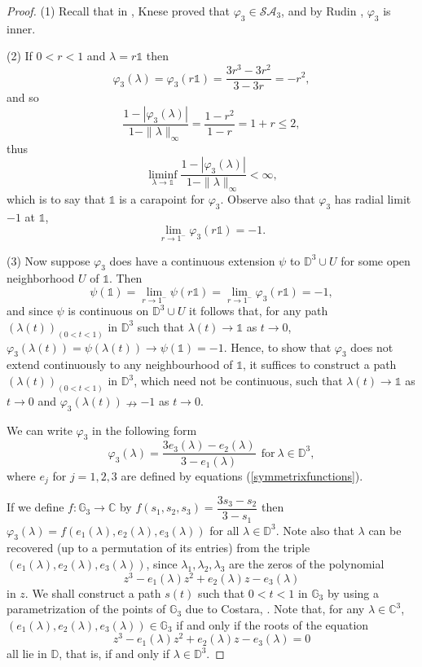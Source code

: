 \documentclass[11pt, reqno]{amsart}
\newcommand\1{\boldsymbol {1}}
\newcommand\lam{\lambda}
\newcommand{\ph}{\varphi}
\numberwithin{equation}{section}
\begin{document}
\begin{proof} (1)
Recall that in \cite{Knese}, Knese proved that $\varphi_3\in\mathcal{SA}_{3}$, and by Rudin \cite[Theorem 5.2.5]{rudinpoly}, $\varphi_3$ is inner. 

(2) If $0 < r < 1$ and $\lam= r\mathds{1}$ then
$$\ph_3(\lam) =\varphi_3(r\mathds{1}) = \dfrac{3r^{3}-3r^{2}}{3-3r} = -r^{2},
$$
and so
\[
\frac{1-|\ph_3(\lam)|}{1-\|\lam\|_\infty} = \frac{1-r^2}{1-r} = 1+r \leq 2,
\]
thus
\[
\liminf_{\lam \to \mathds{1}} \frac{1-|\ph_3(\lam)|}{1-\|\lam\|_\infty}  < \infty,
\]
which is to say that $\mathds{1}$ is a carapoint for $\ph_3$. 
Observe also that $\varphi_3$ has radial limit $-1$ at $\mathds{1}$,
\begin{equation}\label{radiallimitddimenional}
    \lim_{r\rightarrow 1^{-}}\varphi_3(r\mathds{1})=-1.
\end{equation}

(3) Now suppose $\varphi_3$ does have a continuous extension $\psi$ to $\mathbb{D}^{3}\cup U$ for some open neighborhood $U$ of $\mathds{1}$. Then 
$$
\psi(\mathds{1}) = \lim_{r\rightarrow 1^{-}} \psi(r\mathds{1}) = \lim_{r\rightarrow 1^{-}}\varphi_3(r\mathds{1}) = -1,
$$
and since $\psi$ is continuous on $\mathbb{D}^{3}\cup U$ it follows that, for any path $(\lambda(t))_{(0<t<1)}$ in $\mathbb{D}^{3}$ such that $\lambda(t)\rightarrow \mathds{1}$ as $t\rightarrow 0$, $\varphi_3(\lambda(t)) = \psi(\lambda(t))\rightarrow \psi(\mathds{1}) = -1$. Hence, to show that $\varphi_3$ does not extend continuously to any neighbourhood of $\mathds{1}$, it suffices to construct a path $(\lambda(t))_{(0<t<1)}$ in $\mathbb{D}^{3}$, which need not be continuous, such that $\lambda(t)\rightarrow \mathds{1}$ as $t\rightarrow 0$ and $\varphi_3(\lambda(t))\nrightarrow -1$ as $t\rightarrow 0$.

We can write $\varphi_3$ in the following form
$$\varphi_3(\lambda) = \dfrac{3e_{3}(\lambda)-e_{2}(\lambda)}{3-e_{1}(\lambda)}~~\text{for}~\lambda\in\mathbb{D}^{3},$$
where $e_{j}$ for $j=1,2,3$ are defined by equations (\ref{symmetrixfunctions}).

If we define $f:\mathbb{G}_{3}\rightarrow \mathbb{C}$ by $f(s_{1},s_{2},s_{3}) = \dfrac{3s_{3}-s_{2}}{3-s_{1}}$ then $\varphi_3(\lambda) = f(e_{1}(\lambda),e_{2}(\lambda),e_{3}(\lambda))$ for all $\lambda\in\mathbb{D}^{3}$. Note also that $\lambda$ can be recovered (up to a permutation of its entries) from the triple $(e_{1}(\lambda),e_{2}(\lambda),e_{3}(\lambda))$, since $\lambda_{1},\lambda_{2},\lambda_{3}$ are the zeros of the polynomial
$$z^{3}-e_{1}(\lambda)z^{2}+e_{2}(\lambda)z-e_{3}(\lambda)$$
in $z$. We shall construct a path $s(t)$ such that $0<t<1$ in $\mathbb{G}_{3}$ by using a parametrization of the points of $\mathbb{G}_{3}$ due to Costara, \cite[Section 2.5]{Costara}. Note that, for any $\lambda\in\mathbb{C}^{3}$, $(e_{1}(\lambda),e_{2}(\lambda),e_{3}(\lambda))\in\mathbb{G}_{3}$ if and only if the roots of the equation
$$z^{3}-e_{1}(\lambda)z^{2}+e_{2}(\lambda)z-e_{3}(\lambda)=0$$
all lie in $\mathbb{D}$, that is, if and only if $\lambda\in\mathbb{D}^{3}$.


\end{proof}
\end{document}
